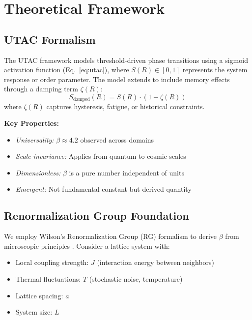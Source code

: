 \documentclass[11pt,letterpaper]{article}
\begin{document}
\section{Theoretical Framework}

\subsection{UTAC Formalism}

The UTAC framework models threshold-driven phase transitions using a sigmoid activation function (Eq.~\ref{eq:utac}), where $S(R) \in [0,1]$ represents the system response or order parameter. The model extends to include memory effects through a damping term $\zeta(R)$:
\begin{equation}
S_{\text{damped}}(R) = S(R) \cdot (1 - \zeta(R))
\label{eq:damped}
\end{equation}
where $\zeta(R)$ captures hysteresis, fatigue, or historical constraints.

\textbf{Key Properties:}
\begin{itemize}
    \item \textit{Universality:} $\beta \approx 4.2$ observed across domains
    \item \textit{Scale invariance:} Applies from quantum to cosmic scales
    \item \textit{Dimensionless:} $\beta$ is a pure number independent of units
    \item \textit{Emergent:} Not fundamental constant but derived quantity
\end{itemize}

\subsection{Renormalization Group Foundation}

We employ Wilson's Renormalization Group (RG) formalism to derive $\beta$ from microscopic principles \cite{Wilson1971,Wilson1974,Fisher1998}. Consider a lattice system with:
\begin{itemize}
    \item Local coupling strength: $J$ (interaction energy between neighbors)
    \item Thermal fluctuations: $T$ (stochastic noise, temperature)
    \item Lattice spacing: $a$
    \item System size: $L$
\end{itemize}
\end{document}
